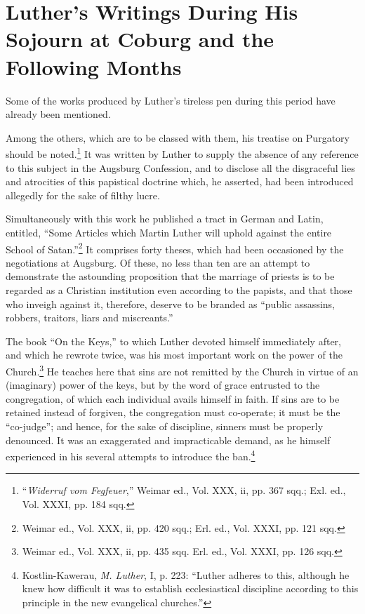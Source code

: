 \section{Luther’s Writings During His Sojourn at Coburg and the Following Months}

Some of the works produced by Luther’s tireless pen during this
period have already been mentioned.

Among the others, which are to be classed with them, his treatise
on Purgatory should be noted.\footnote
{“\textit{Widerruf vom Fegfeuer},” Weimar ed., Vol. XXX, ii, pp. 367 sqq.; Exl. ed., Vol.
XXXI, pp. 184 sqq.}
It was written by Luther to supply
the absence of any reference to this subject in the Augsburg Confession,
and to disclose all the disgraceful lies and atrocities of this papistical
doctrine which, he asserted, had been introduced allegedly for
the sake of filthy lucre.

Simultaneously with this work he published a tract in German and
Latin, entitled, “Some Articles which Martin Luther will uphold
against the entire School of Satan.”\footnote
{Weimar ed., Vol. XXX, ii, pp. 420 sqq.; Erl. ed., Vol. XXXI, pp. 121 sqq.}
It comprises forty theses, which
had been occasioned by the negotiations at Augsburg. Of these, no
less than ten are an attempt to demonstrate the astounding proposition
that the marriage of priests is to be regarded as a Christian institution
even according to the papists, and that those who inveigh
against it, therefore, deserve to be branded as “public assassins, robbers,
traitors, liars and miscreants.”

The book “On the Keys,” to which Luther devoted himself immediately
after, and which he rewrote twice, was his most important
work on the power of the Church.\footnote{Weimar ed., Vol. XXX, ii, pp. 435 sqq. Erl. ed., Vol. XXXI, pp. 126 sqq.}
He teaches here that sins are
not remitted by the Church in virtue of an (imaginary) power of the
keys, but by the word of grace entrusted to the congregation, of
which each individual avails himself in faith. If sins are to be retained
instead of forgiven, the congregation must co-operate; it must be the
“co-judge”; and hence, for the sake of discipline, sinners must be
properly denounced. It was an exaggerated and impracticable demand,
as he himself experienced in his several attempts to introduce
the ban.\footnote
{Kostlin-Kawerau, \textit{M. Luther}, I, p. 223: “Luther adheres to this, although he knew
how difficult it was to establish ecclesiastical discipline according to this principle in the
new evangelical churches.”}

